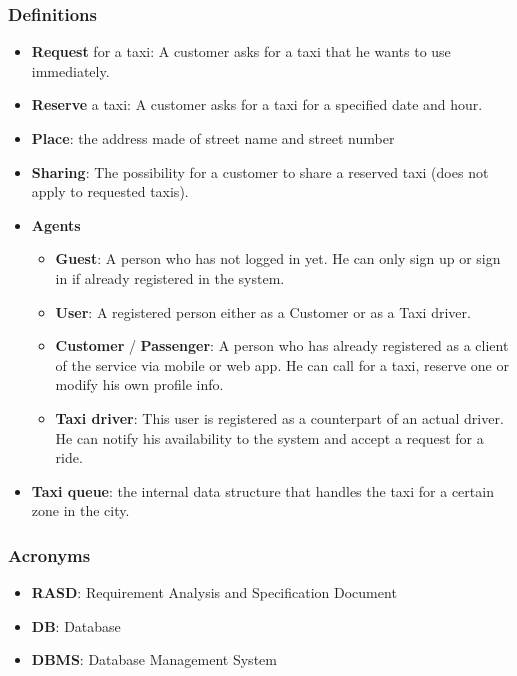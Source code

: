 \subsubsection{Definitions}
	\begin{itemize}
		\item \textbf{Request} for a taxi: A customer asks for a taxi that he wants to use immediately. 
		\item \textbf{Reserve} a taxi: A customer asks for a taxi for a specified date and hour.
		\item \textbf{Place}: the address made of street name and street number
		\item \textbf{Sharing}: The possibility for a customer to share a reserved taxi (does not apply to requested taxis).
		
		\item \textbf{Agents}
		\begin{itemize}
			\item \textbf{Guest}: A person who has not logged in yet. He can only sign up or sign in if already registered in the system.
			\item \textbf{User}: A registered person either as a Customer or as a Taxi driver.
			\item \textbf{Customer} / \textbf{Passenger}: A person who has already registered as a client of the service via mobile or web app. He can call for a taxi, reserve one or modify his own profile info.
			\item \textbf{Taxi driver}: This user is registered as a counterpart of an actual driver. He can notify his availability to the system and accept a request for a ride.
		\end{itemize}
		
		\item \textbf{Taxi queue}: the internal data structure that handles the taxi for a certain zone in the city.
	\end{itemize}
	
\subsubsection{Acronyms}
\begin{itemize}
	\item \textbf{RASD}: Requirement Analysis and Specification Document
	\item \textbf{DB}: Database
	\item \textbf{DBMS}: Database Management System
\end{itemize}

